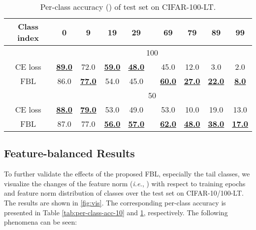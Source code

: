 \documentclass{article}
\def\ie{\emph{i.e.}} \def\Ie{\emph{I.e}\onedot}
\begin{document}
\begin{table}[t]
\begin{minipage}[t]{0.5\textwidth}
\centering  \caption{Per-class accuracy () of test set on CIFAR-100-LT.}
	\label{tab:per-class-acc-100}
    \setlength{\tabcolsep}{8pt}
\resizebox{0.95\textwidth}{!}
	{
	\begin{tabular}{c |c c c c c c c c c c}
		\toprule[0.8pt]
		Class index & 0 & 9 & 19& 29& \multicolumn{2}{c}{} & 69& 79& 89& 99 \\
		\hline
        \hline
		 & \multicolumn{10}{c}{100} \\
        \hline		
		CE loss & \underline{\textbf{89.0}}& 72.0& \underline{\textbf{59.0}}& \underline{\textbf{48.0}}& \multicolumn{2}{c}{}& 45.0& 12.0& 3.0& 2.0\\
		FBL& 86.0& \underline{\textbf{77.0}}& 54.0& 45.0& \multicolumn{2}{c}{}& \underline{\textbf{60.0}}& \underline{\textbf{27.0}}& \underline{\textbf{22.0}}& \underline{\textbf{8.0}}\\
		\hline
		 & \multicolumn{10}{c}{50} \\
        \hline		
		CE loss & \underline{\textbf{88.0}}& \underline{\textbf{79.0}}& 53.0& 49.0& \multicolumn{2}{c}{}& 53.0& 10.0& 19.0& 13.0 \\
		FBL & 87.0& 77.0& \underline{\textbf{56.0}}& \underline{\textbf{57.0}}& \multicolumn{2}{c}{}& \underline{\textbf{62.0}}& \underline{\textbf{48.0}}&\underline{\textbf{38.0}}& \underline{\textbf{17.0}}\\
		\bottomrule[0.8pt]
	\end{tabular}
	}
 \end{minipage}
 \vspace{-12pt}
\end{table}

\subsection{Feature-balanced Results}
To further validate the effects of the proposed FBL, especially the tail classes, we visualize the changes of the feature norm (\ie, ) with respect to training epochs and feature norm distribution of classes over the test set on CIFAR-10/100-LT. The results are shown in \cref{fig:vis}. The corresponding per-class accuracy is presented in Table \ref{tab:per-class-acc-10} and \ref{tab:per-class-acc-100}, respectively. The following phenomena can be seen:
\end{document}
